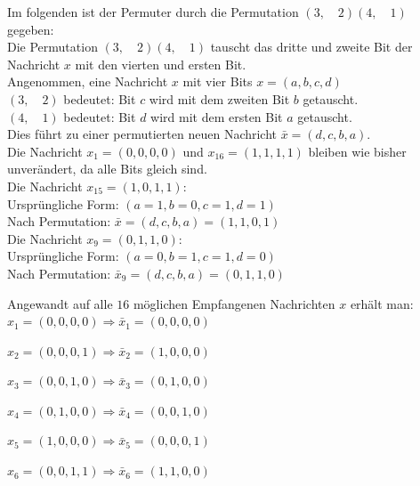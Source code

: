 \begin{Beispiel}
    Im folgenden ist der Permuter durch die Permutation $(3,\quad 2)(4,\quad 1)$ gegeben:\\

    Die Permutation $(3,\quad 2)(4,\quad 1)$ tauscht das dritte und zweite Bit der Nachricht $x$ mit den vierten und ersten Bit.\\
    
    Angenommen, eine Nachricht $x$ mit vier Bits $x = (a,b,c,d)$\\
    
    $(3,\quad 2)$ bedeutet: Bit $c$ wird mit dem zweiten Bit $b$ getauscht.\\
    $(4,\quad 1)$ bedeutet: Bit $d$ wird mit dem ersten Bit $a$ getauscht.\\
    
    Dies führt zu einer permutierten neuen Nachricht $\bar{x} = (d,c,b,a).$\\
    Die Nachricht  $x_{1} = (0,0,0,0)$ und  $x_{16} = (1,1,1,1)$  bleiben wie bisher unverändert, da alle Bits gleich sind.\\
    
    
    Die Nachricht $x_{15}=(1,0,1,1)$:\\
    Ursprüngliche Form: $(a= 1, b=0, c=1, d=1)$\\
    Nach Permutation: $\bar{x} = (d,c,b,a)=(1,1,0,1)$\\
    
    Die Nachricht $x_9= (0,1,1,0):$\\
    Ursprüngliche Form: $(a=0, b=1, c=1, d=0)$\\
    Nach Permutation: $\bar{x}_{9}=(d,c,b,a)=(0,1,1,0)$\\
    \pagebreak
    
    Angewandt auf alle $16$ möglichen Empfangenen Nachrichten $x$ erhält man:\\
    
    
    $x_1= (0,0,0,0) \Rightarrow \bar{x}_{1} = (0,0,0,0)$
    
    $x_2= (0,0,0,1) \Rightarrow \bar{x}_{2} = (1,0,0,0)$
    
    $x_3= (0,0,1,0) \Rightarrow \bar{x}_{3} = (0,1,0,0)$
    
    $x_4= (0,1,0,0) \Rightarrow \bar{x}_{4} = (0,0,1,0)$
    
    $x_5= (1,0,0,0) \Rightarrow \bar{x}_{5} = (0,0,0,1)$
    
    $x_6= (0,0,1,1) \Rightarrow \bar{x}_{6} = (1,1,0,0)$
    

\end{Beispiel}
